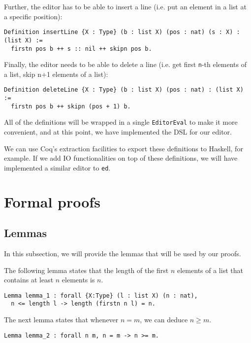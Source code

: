 \documentclass{article}
\theoremstyle{definition}
\begin{document}
Further, the editor has to be able to insert a line (i.e. put an element in a list at a specific position):

\begin{lstlisting}
Definition insertLine {X : Type} (b : list X) (pos : nat) (s : X) : (list X) :=
  firstn pos b ++ s :: nil ++ skipn pos b.
\end{lstlisting}

Finally, the editor needs to be able to delete a line (i.e. get first \texttt{n}-th elements of a list, skip n+1 elements of a list):

\begin{lstlisting}
Definition deleteLine {X : Type} (b : list X) (pos : nat) : (list X) :=
  firstn pos b ++ skipn (pos + 1) b.
\end{lstlisting}

All of the definitions will be wrapped in a single \texttt{EditorEval} to make it more convenient, and at this point, we have implemented the DSL for our editor.

We can use Coq's extraction facilities to export these definitions to Haskell, for example. If we add IO functionalities on top of these definitions, we will have implemented a similar editor to \texttt{ed}.

\section{Formal proofs}

\subsection{Lemmas}

In this subsection, we will provide the lemmas that will be used by our proofs.

The following lemma states that the length of the first \(n\) elements of a list that contains at least \(n\) elements is \(n\).

\begin{lstlisting}
Lemma lemma_1 : forall {X:Type} (l : list X) (n : nat),
  n <= length l -> length (firstn n l) = n.
\end{lstlisting}

The next lemma states that whenever \(n = m\), we can deduce \(n \geq m\).

\begin{lstlisting}
Lemma lemma_2 : forall n m, n = m -> n >= m.
\end{lstlisting}
\end{document}
